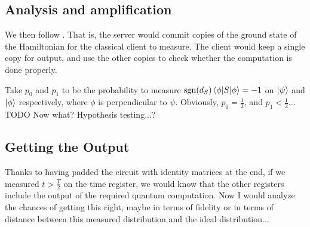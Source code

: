 \subsection{Analysis and amplification}

We then follow \cite{mahadev_delegation}. That is, the server would commit copies of the ground state of the Hamiltonian for the classical client to measure.
The client would keep a single copy for output, and use the other copies to check whether the computation is done properly.

Take $p_0$ and $p_1$ to be the probability to measure $\operatorname{sgn}(d_S)\braket{\phi|S|\phi}=-1$ on $\ket\psi$ and $\ket\phi$ respectively, where $\phi$ is perpendicular to $\psi$. Obviously, $p_0=\frac{1}{2}$, and $p_1<\frac{1}{2}$... TODO Now what? Hypothesis testing...?

\subsection{Getting the Output}

Thanks to having padded the circuit with identity matrices at the end, if we measured $t>\frac{T}{2}$ on the time register, we would know that the other registers include the output of the required quantum computation. Now I would analyze the chances of getting this right, maybe in terms of fidelity or in terms of distance between this measured distribution and the ideal distribution...
